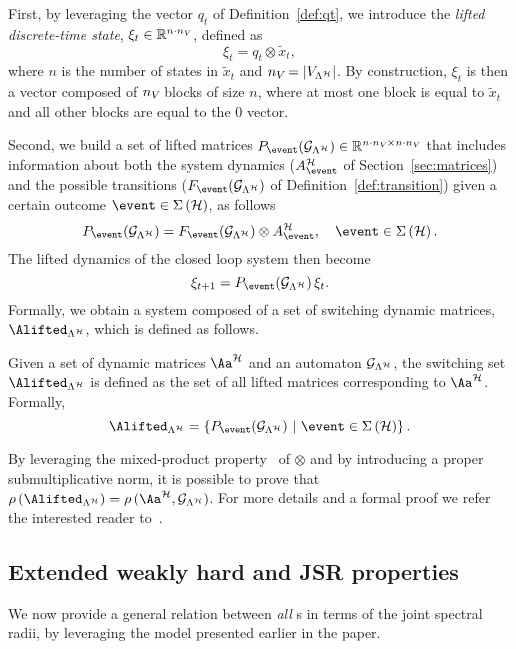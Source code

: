 First, by leveraging the vector $q_t$ of Definition~\ref{def:qt}, we introduce the \emph{lifted discrete-time state}, $\xi_t\in\mathbb{R}^{n\cdot n_{V_{}}}$, defined as 
$$\xi_t = q_t\otimes \tilde x_t,$$
where $n$ is the number of states in $\tilde x_t$ and $n_{V_{}} = \left|V_{\Lambda^{\mathcal{H}}}\right|$.
By construction, $\xi_t$ is then a vector composed of $n_{V_{}}$ blocks of size $n$, where at most one block is equal to $\tilde x_t$ and all other blocks are equal to the $0$ vector.

Second, we build a set of lifted matrices $P_{\event} ( \GG{\Lambda^\strat} )\in\R^{n\cdot n_{\VV{}}\times n\cdot n_{\VV{}}}$ that includes information about both the system dynamics ($A^\strat_\event$ of Section~\ref{sec:matrices}) and the possible transitions ($F_{\event} ( \GG{\Lambda^\strat} )$ of Definition~\ref{def:transition}) given a certain outcome $\event\in\Sigma\left(\strat\right)$, as follows
%
\begin{equation}
    \label{eq:lifted_matrix}
    P_{\event} ( \GG{\Lambda^\strat} ) = F_{\event} ( \GG{\Lambda^\strat} )\otimes A_\event^\strat,\quad \event \in \Sigma \left( \strat \right).
\end{equation}
%
The lifted dynamics of the closed loop system then become%
%
$$
    \xi_{t+1} = P_{\event} ( \GG{\Lambda^\strat} )\,\xi_t.
$$
%
Formally, we obtain a system composed of a set of switching dynamic matrices, $\Alifted_{\Lambda^\strat}$, which is defined as follows.
%
\begin{definition}%
    \label{def:switching_set}%
    Given a set of dynamic matrices $\Aa^{\strat}$ and an automaton $\mathcal{G}_{\Lambda^{\mathcal{H}}}$, the switching set $\Alifted_{\Lambda^\strat}$ is defined as the set of all lifted matrices corresponding to $\Aa^{\strat}$.
    Formally,
    $$
    \Alifted_{\Lambda^\strat} = \left\{ P_{\event} ( \GG{\Lambda^\strat} ) \,\, | \,\, \event \in \Sigma\left(\strat\right) \right\}.
    $$
    \end{definition}
%
By leveraging the mixed-product property~\cite{horn2012matrix} of $\otimes$ and by introducing a proper submultiplicative norm, it is possible to prove that $\rho\left(\Alifted_{\Lambda^\strat}\right)= \rho\,(\Aa^{\strat},\GG{\Lambda^\strat})$.
For more details and a formal proof we refer the interested reader to~\cite{xu2020approximation}.


\subsection{Extended weakly hard and JSR properties}
\label{sec:analytic_results}
%
We now provide a general relation between \emph{all} \ewhc{}s in terms of the joint spectral radii, by leveraging the model presented earlier in the paper.

